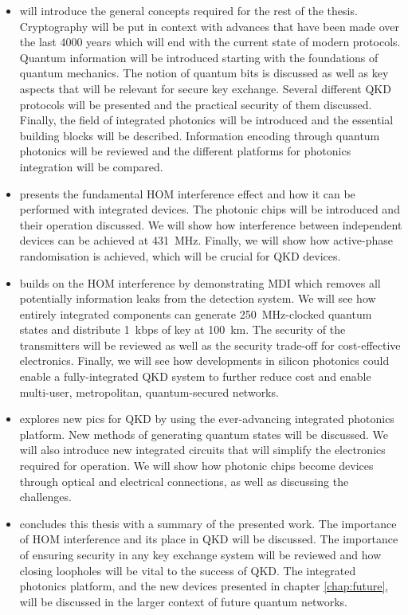 \begin{itemize}
	\item {} will introduce the general concepts required for the rest of the thesis. Cryptography will be put in context with advances that have been made over the last 4000 years which will end with the current state of modern protocols. Quantum information will be introduced starting with the foundations of quantum mechanics. The notion of quantum bits is discussed as well as key aspects that will be relevant for secure key exchange. Several different \ac{QKD} protocols will be presented and the practical security of them discussed. Finally, the field of integrated photonics will be introduced and the essential building blocks will be described. Information encoding through quantum photonics will be reviewed and the different platforms for photonics integration will be compared.
	\item {} presents the fundamental \ac{HOM} interference effect and how it can be performed with integrated devices. The photonic chips will be introduced and their operation discussed. We will show how interference between independent devices can be achieved at \SI{431}{MHz}. Finally, we will show how active-phase randomisation is achieved, which will be crucial for \ac{QKD} devices. 
	\item {} builds on the \ac{HOM} interference by demonstrating \ac{MDI} which removes all potentially information leaks from the detection system. We will see how entirely integrated components can generate \SI{250}{MHz}-clocked quantum states and distribute \SI{1}{kbps} of key at \SI{100}{km}. The security of the transmitters will be reviewed as well as the security trade-off for cost-effective electronics. Finally, we will see how developments in silicon photonics could enable a fully-integrated \ac{QKD} system to further reduce cost and enable multi-user, metropolitan, quantum-secured networks.
	\item {} explores new \acp{pic} for \ac{QKD} by using the ever-advancing integrated photonics platform. New methods of generating quantum states will be discussed. We will also introduce new integrated circuits that will simplify the electronics required for operation. We will show how photonic chips become devices through optical and electrical connections, as well as discussing the challenges. 
	\item {} concludes this thesis with a summary of the presented work. The importance of \ac{HOM} interference and its place in \ac{QKD} will be discussed. The importance of ensuring security in any key exchange system will be reviewed and how closing loopholes will be vital to the success of \ac{QKD}. The integrated photonics platform, and the new devices presented in chapter \ref{chap:future}, will be discussed in the larger context of future quantum networks.
\end{itemize}

